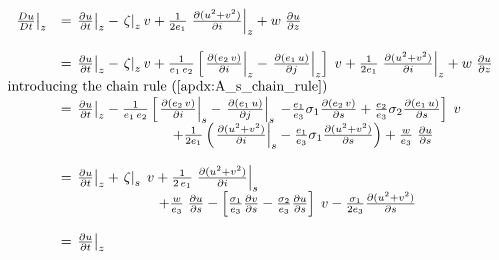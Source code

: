 \documentclass[../main/NEMO_manual]{subfiles}
\begin{document}
\begin{subequations}
  \begin{align*}
    {
    \begin{array}{*{20}l}
      \left. \frac{D u}{D t} \right|_z
      &= \left. {\frac{\partial u }{\partial t}} \right|_z
        - \left. \zeta \right|_z v
        + \frac{1}{2e_1} \left.{ \frac{\partial (u^2+v^2)}{\partial i}} \right|_z
        + w \;\frac{\partial u}{\partial z} \\ \\
      &= \left. {\frac{\partial u }{\partial t}} \right|_z
        - \left. \zeta \right|_z v
        +  \frac{1}{e_1 \,e_2 }\left[ { \left.{ \frac{\partial (e_2 \,v)}{\partial i} }\right|_z
        -\left.{ \frac{\partial (e_1 \,u)}{\partial j} }\right|_z } \right] \; v
        +  \frac{1}{2e_1} \left.{ \frac{\partial (u^2+v^2)}{\partial i} } \right|_z
        +  w \;\frac{\partial u}{\partial z}      \\
      \intertext{introducing the chain rule (\autoref{apdx:A_s_chain_rule}) }
      &= \left. {\frac{\partial u }{\partial t}} \right|_z
        - \frac{1}{e_1\,e_2}\left[ { \left.{ \frac{\partial (e_2 \,v)}{\partial i} } \right|_s
        -\left.{ \frac{\partial (e_1 \,u)}{\partial j} } \right|_s } \right.
        \left. {-\frac{e_1}{e_3}\sigma_1 \frac{\partial (e_2 \,v)}{\partial s}
        +\frac{e_2}{e_3}\sigma_2 \frac{\partial (e_1 \,u)}{\partial s}} \right] \; v  \\
      & \qquad \qquad \qquad \qquad
        {
        + \frac{1}{2e_1} \left(                                  \left.  \frac{\partial (u^2+v^2)}{\partial i} \right|_s
        - \frac{e_1}{e_3}\sigma_1 \frac{\partial (u^2+v^2)}{\partial s}               \right)
        + \frac{w}{e_3 } \;\frac{\partial u}{\partial s}
        } \\ \\
      &= \left. {\frac{\partial u }{\partial t}} \right|_z
        + \left. \zeta \right|_s \;v
        + \frac{1}{2\,e_1}\left. {\frac{\partial (u^2+v^2)}{\partial i}} \right|_s \\
      &\qquad \qquad \qquad \quad
        + \frac{w}{e_3 } \;\frac{\partial u}{\partial s}
        - \left[   {\frac{\sigma_1 }{e_3 }\frac{\partial v}{\partial s}
        - \frac{\sigma_2 }{e_3 }\frac{\partial u}{\partial s}}   \right]\;v
        - \frac{\sigma_1 }{2e_3 }\frac{\partial (u^2+v^2)}{\partial s} \\ \\
      &= \left. {\frac{\partial u }{\partial t}} \right|_z

\end{array}}
\end{align*}
\end{subequations}
\end{document}
